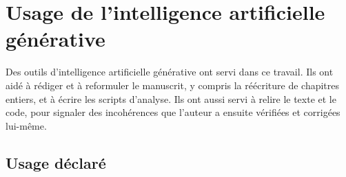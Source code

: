 \chapter{Usage de l'intelligence artificielle générative}
\label{ann:ia}


Des outils d'intelligence artificielle générative ont servi dans ce travail. Ils ont aidé à rédiger
et à reformuler le manuscrit, y compris la réécriture de chapitres entiers, et à écrire les scripts
d'analyse. Ils ont aussi servi à relire le texte et le code, pour signaler des incohérences que
l'auteur a ensuite vérifiées et corrigées lui-même.

\section{Usage déclaré}

